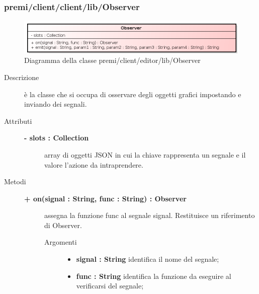 \subsubsection{premi/client/client/lib/Observer}
\begin{figure}[h]
\begin{center}
\includegraphics[scale=0.70]{img/diacla/Observer.png}
\caption{Diagramma della classe premi/client/editor/lib/Observer}
\end{center}
\end{figure}

\begin{description}
\item[Descrizione] \hfill
	è la classe che si occupa di osservare degli oggetti grafici impostando e inviando dei segnali.
		
	
\item[Attributi] \hfill
	\begin{description}
		\item[\textbf{- slots : Collection			}] \hfill
			array di oggetti JSON in cui la chiave rappresenta un segnale e il valore l'azione da intraprendere.
	\end{description}
	
	
\item[Metodi] \hfill

	\begin{description}
		\item[\textbf{\color{blue}+ on(signal : String, func : String) : Observer			}] \hfill
			assegna la funzione func al segnale signal. Restituisce un riferimento di Observer.
			
		\begin{description}
			\item[Argomenti] \hfill
				\begin{itemize}
				
					\item \textbf{signal : String			} \hfill
					identifica il nome del segnale;
					\item \textbf{func : String			} \hfill
					identifica la funzione da eseguire al verificarsi del segnale;			
				\end{itemize}
		\end{description}
	\end{description}		
	

\end{description}
